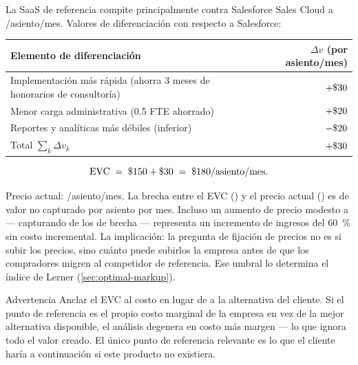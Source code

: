 \begin{example}
La SaaS de referencia compite principalmente contra Salesforce Sales Cloud a /asiento/mes. Valores de diferenciación con respecto a Salesforce:

\medskip
\begin{tabular}{lr}
  \toprule
  Elemento de diferenciación & \(\Delta v\) (por asiento/mes) \\
  \midrule
  Implementación más rápida (ahorra 3 meses de honorarios de consultoría) & $+\$\num{30}$ \\
  Menor carga administrativa (0.5 FTE ahorrado)                           & $+\$\num{20}$ \\
  Reportes y analíticas más débiles (inferior)                            & $-\$\num{20}$ \\
  \midrule
  Total \(\sum_k \Delta v_k\)                                             & $+\$\num{30}$ \\
  \bottomrule
\end{tabular}

\medskip
\[
  \mathrm{EVC} \;=\; \$\num{150} + \$\num{30} \;=\; \$\num{180}/\text{asiento/mes}.
\]

Precio actual: /asiento/mes. La brecha entre el EVC () y el precio actual () es  de valor no capturado por asiento por mes. Incluso un aumento de precio modesto a  --- capturando  de los  de brecha --- representa un incremento de ingresos del \qty{60}{\percent} sin costo incremental. La implicación: la pregunta de fijación de precios no es si subir los precios, sino cuánto puede subirlos la empresa antes de que los compradores migren al competidor de referencia. Ese umbral lo determina el índice de Lerner (\cref{sec:optimal-markup}).
\end{example}

\begin{admonition}{Advertencia}
Anclar el EVC al costo en lugar de a la alternativa del cliente. Si el punto de referencia es el propio costo marginal de la empresa en vez de la mejor alternativa disponible, el análisis degenera en costo más margen --- lo que ignora todo el valor creado. El único punto de referencia relevante es lo que el cliente haría a continuación si este producto no existiera.
\end{admonition}

